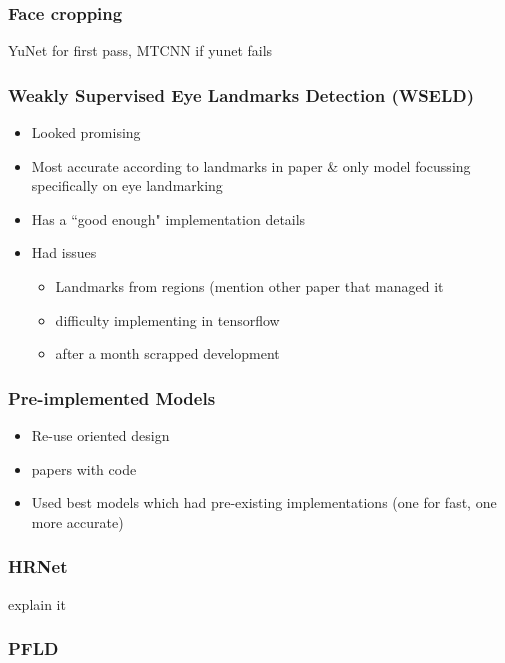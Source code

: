 \subsubsection{Face cropping}

YuNet for first pass, MTCNN if yunet fails

\subsubsection{Weakly Supervised Eye Landmarks Detection (WSELD)}

\begin{itemize}
    \item Looked promising
    \item Most accurate according to landmarks in paper \& only model focussing specifically on eye landmarking
    \item Has a ``good enough" implementation details
    \item Had issues
    \begin{itemize}
        \item Landmarks from regions (mention other paper that managed it
        \item difficulty implementing in tensorflow
        \item after a month scrapped development
    \end{itemize}
\end{itemize}

\subsubsection{Pre-implemented Models}

\begin{itemize}
    \item Re-use oriented design
    \item papers with code
    \item Used best models which had pre-existing implementations (one for fast, one more accurate)
\end{itemize}

\subsubsection{HRNet}

explain it

\subsubsection{PFLD}

